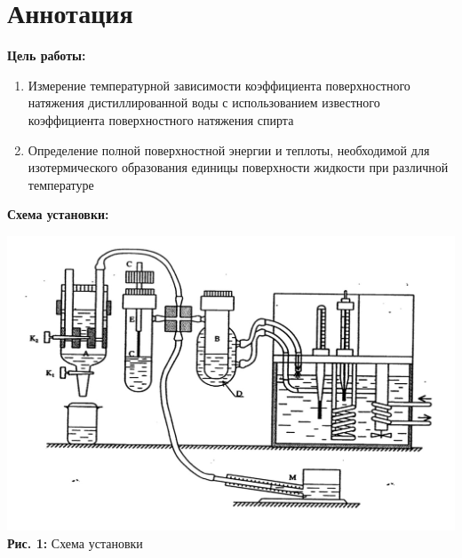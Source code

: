 \documentclass[12pt,a4paper]{scrartcl}
\begin{document}
	\section{Аннотация}
	
	\textbf{Цель работы: }
	
	\begin{enumerate}
		\item Измерение температурной зависимости коэффициента поверхностного натяжения дистиллированной воды с использованием известного коэффициента поверхностного натяжения спирта
		\item Определение полной поверхностной энергии  и теплоты, необходимой для изотермического образования единицы  поверхности жидкости  при различной температуре
	\end{enumerate}
	
	\textbf{Схема установки:}
	\begin{center}
		\includegraphics[scale=0.3]{PIC_1}
		\\\textbf{Рис. 1:} Схема установки
	\end{center}
		
\end{document}
